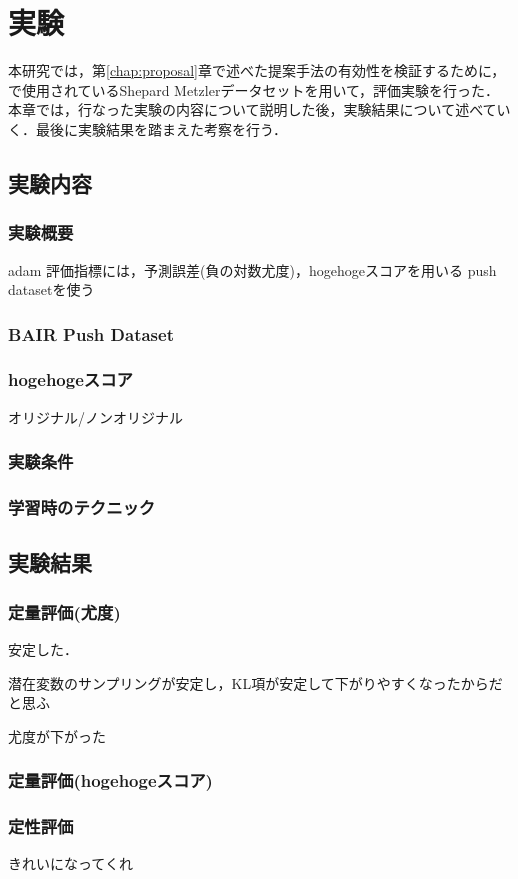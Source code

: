\chapter{実験}
\label{chap:experiment}
本研究では，第\ref{chap:proposal}章で述べた提案手法の有効性を検証するために， で使用されているShepard Metzlerデータセットを用いて，評価実験を行った．本章では，行なった実験の内容について説明した後，実験結果について述べていく．最後に実験結果を踏まえた考察を行う．

\section{実験内容}
\subsection{実験概要}
adam
評価指標には，予測誤差(負の対数尤度)，hogehogeスコアを用いる
push datasetを使う

\subsection{BAIR Push Dataset}
\subsection{hogehogeスコア}
オリジナル/ノンオリジナル
\subsection{実験条件}
\subsection{学習時のテクニック}
\section{実験結果}
\subsection{定量評価(尤度)}

安定した．

潜在変数のサンプリングが安定し，KL項が安定して下がりやすくなったからだと思ふ

尤度が下がった

\subsection{定量評価(hogehogeスコア)}
\subsection{定性評価}
きれいになってくれ